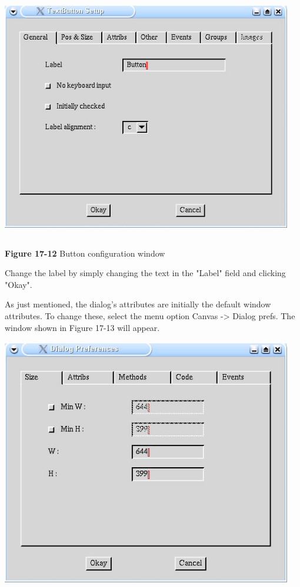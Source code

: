 \begin{center}
\includegraphics[width=5.0in,height=4.25in]{ub-img/ub-img61.jpg}
\end{center}

{\sffamily\bfseries Figure 17-12}
{\sffamily Button configuration window}

Change the label by simply changing the text in the
"Label" field and clicking
"Okay".

As just mentioned, the dialog's attributes are
initially the default window attributes. To change these, select the
menu option Canvas -{\textgreater} Dialog prefs. The window shown in
Figure 17-13 will appear.

\begin{center}
\includegraphics[width=5.0in,height=4.25in]{ub-img/ub-img63.jpg}
\end{center}

